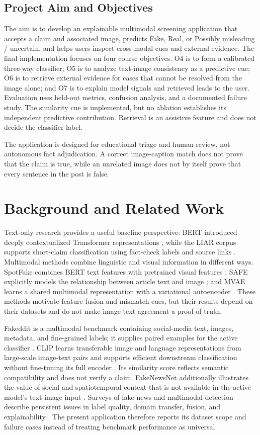 \documentclass[conference]{IEEEtran}
\begin{document}
\subsection{Project Aim and Objectives}
The aim is to develop an explainable multimodal screening application that accepts a claim and associated image, predicts Fake, Real, or Possibly misleading / uncertain, and helps users inspect cross-modal cues and external evidence. The final implementation focuses on four course objectives. O4 is to form a calibrated three-way classifier; O5 is to analyze text-image consistency as a predictive cue; O6 is to retrieve external evidence for cases that cannot be resolved from the image alone; and O7 is to explain model signals and retrieved leads to the user. Evaluation uses held-out metrics, confusion analysis, and a documented failure study. The similarity cue is implemented, but no ablation establishes its independent predictive contribution. Retrieval is an assistive feature and does not decide the classifier label.

The application is designed for educational triage and human review, not autonomous fact adjudication. A correct image-caption match does not prove that the claim is true, while an unrelated image does not by itself prove that every sentence in the post is false.

\section{Background and Related Work}
Text-only research provides a useful baseline perspective: BERT introduced deeply contextualized Transformer representations \cite{bert}, while the LIAR corpus supports short-claim classification using fact-check labels and source links \cite{liar}. Multimodal methods combine linguistic and visual information in different ways. SpotFake combines BERT text features with pretrained visual features \cite{spotfake}; SAFE explicitly models the relationship between article text and image \cite{safe}; and MVAE learns a shared multimodal representation with a variational autoencoder \cite{mvae}. These methods motivate feature fusion and mismatch cues, but their results depend on their datasets and do not make image-text agreement a proof of truth.

Fakeddit is a multimodal benchmark containing social-media text, images, metadata, and fine-grained labels; it supplies paired examples for the active classifier \cite{fakeddit,fakedditmirror}. CLIP learns transferable image and language representations from large-scale image-text pairs and supports efficient downstream classification without fine-tuning its full encoder \cite{clip}. Its similarity score reflects semantic compatibility and does not verify a claim. FakeNewsNet additionally illustrates the value of social and spatiotemporal context that is not available in the active model's text-image input \cite{fakenewsnet}. Surveys of fake-news and multimodal detection describe persistent issues in label quality, domain transfer, fusion, and explainability \cite{survey_fake,survey_multimodal}. The present application therefore reports its dataset scope and failure cases instead of treating benchmark performance as universal.
\end{document}
